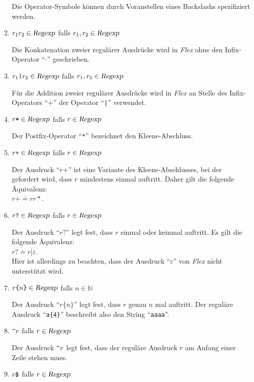 \begin{enumerate}
      Die Operator-Symbole k\"onnen durch Voranstellen eines Backslashs spezifiziert werden.
\item $r_1r_2 \in \textsl{Regexp}$ \quad falls $r_1,r_2 \in \textsl{Regexp}$

      Die Konkatenation zweier regul\"arer Ausdr\"ucke wird in \textsl{Flex}\/ ohne den Infix-Operator
      ``$\cdot$'' geschrieben.
\item $r_1\texttt{|}r_2 \in \textsl{Regexp}$ \quad falls $r_1,r_2 \in \textsl{Regexp}$

      F\"ur die Addition zweier regul\"arer Ausdr\"ucke wird in \textsl{Flex}\/ an Stelle des Infix-Operators
      ``$+$'' der Operator ``\texttt{|}'' verwendet.
\item $r\texttt{*} \in \textsl{Regexp}$ \quad falls $r \in \textsl{Regexp}$

      Der Postfix-Operator ``\texttt{*}'' bezeichnet den Kleene-Abschluss.
\item $r\texttt{+} \in \textsl{Regexp}$ \quad falls $r \in \textsl{Regexp}$

      Der Ausdruck ``$r\texttt{+}$'' ist eine Variante des Kleene-Abschlusses, bei der
      gefordert wird, dass $r$ mindestens einmal auftritt.  Daher gilt die folgende \"Aquivalenz:
      \\[0.2cm]
      \hspace*{1.3cm}
      $r\texttt{+} \doteq rr*$.
\item $r\texttt{?} \in \textsl{Regexp}$ \quad falls $r \in \textsl{Regexp}$

      Der Ausdruck ``$r\texttt{?}$'' legt fest, dass $r$ einmal oder keinmal auftritt.
      Es gilt die folgende \"Aquivalenz:
      \\[0.2cm]
      \hspace*{1.3cm}
      $r\texttt{?} \doteq r|\varepsilon$.
      \\[0.2cm]
      Hier ist allerdings zu beachten, dass der Ausdruck ``$\varepsilon$'' 
      von \textsl{Flex} nicht unterst\"utzt wird.
\item $r\texttt{\{}n\texttt{\}} \in \textsl{Regexp}$ \quad falls $n \in \mathbb{N}$

      Der Ausdruck ``$r\texttt{\{}n\texttt{\}}$'' legt fest, dass $r$ genau $n$ mal auftritt.
      Der regul\"are Ausdruck ``\texttt{a\{4\}}'' beschreibt also den String ``\texttt{aaaa}''.
\item $\texttt{\symbol{94}}r$ \quad falls $r \in \textsl{Regexp}$

      Der Ausdruck $\texttt{\symbol{94}}r$ legt fest, dass der regul\"are Ausdruck $r$
      am Anfang einer Zeile stehen muss.  
\item $r\texttt{\symbol{36}}$ \quad falls $r \in \textsl{Regexp}$


\end{enumerate}
